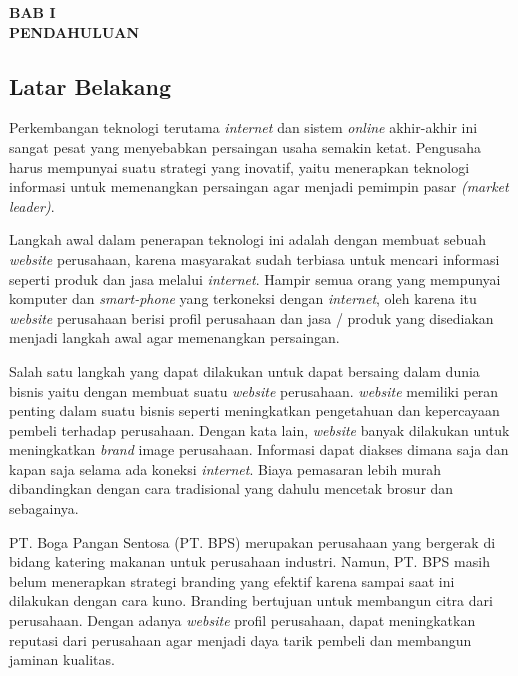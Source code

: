 

\begin{center}
    \textbf{BAB I \\ PENDAHULUAN}
\end{center}

\setcounter{section}{1}
\setcounter{subsection}{0}

\subsection{Latar Belakang}

Perkembangan teknologi terutama \emph{internet} dan sistem \emph{online} akhir-akhir ini sangat pesat 
yang menyebabkan persaingan usaha semakin ketat. Pengusaha harus mempunyai suatu strategi yang inovatif, 
yaitu menerapkan teknologi informasi untuk memenangkan persaingan agar menjadi pemimpin pasar \emph{(market leader)}.

Langkah awal dalam penerapan teknologi ini adalah dengan membuat sebuah \emph{website} perusahaan, 
karena masyarakat sudah terbiasa untuk mencari informasi seperti produk dan jasa melalui \emph{internet}. 
Hampir semua orang yang mempunyai komputer dan \emph{smart-phone} yang terkoneksi dengan \emph{internet}, oleh karena itu 
\emph{website} perusahaan berisi profil perusahaan dan jasa / produk yang disediakan 
menjadi langkah awal agar memenangkan persaingan.

Salah satu langkah yang dapat dilakukan untuk dapat bersaing dalam dunia bisnis yaitu dengan membuat suatu \emph{website} perusahaan. 
\emph{website} memiliki peran penting dalam suatu bisnis 
seperti meningkatkan pengetahuan dan kepercayaan pembeli terhadap perusahaan. 
Dengan kata lain, \emph{website} banyak dilakukan untuk meningkatkan \emph{brand} image perusahaan. 
Informasi dapat diakses dimana saja dan kapan saja  selama ada koneksi \emph{internet}. 
Biaya pemasaran lebih murah dibandingkan dengan cara tradisional yang dahulu mencetak brosur dan sebagainya.

PT. Boga Pangan Sentosa (PT. BPS) merupakan perusahaan yang bergerak di bidang katering makanan untuk perusahaan industri. 
Namun, PT. BPS masih belum menerapkan strategi branding yang efektif karena sampai saat ini dilakukan dengan cara kuno. 
Branding bertujuan untuk membangun citra dari perusahaan. Dengan adanya \emph{website} profil perusahaan, 
dapat meningkatkan reputasi dari perusahaan agar menjadi daya tarik pembeli dan membangun jaminan kualitas.


